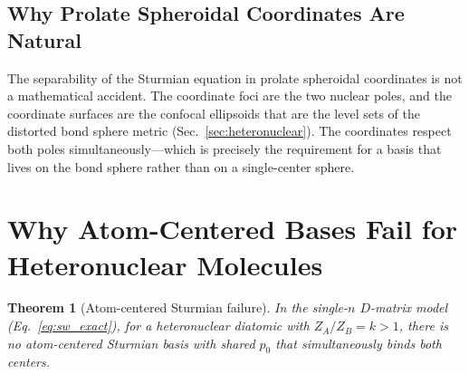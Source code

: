\documentclass[aps,pra,twocolumn,superscriptaddress,longbibliography]{revtex4-2}
\newtheorem{theorem}{Theorem}
\theoremstyle{remark}
\theoremstyle{plain}
\begin{document}
\subsection{Why Prolate Spheroidal Coordinates Are Natural}

The separability of the Sturmian equation in prolate spheroidal
coordinates is not a mathematical accident.  The coordinate foci are
the two nuclear poles, and the coordinate surfaces are the confocal
ellipsoids that are the level sets of the distorted bond sphere metric
(Sec.~\ref{sec:heteronuclear}).  The coordinates respect both poles
simultaneously---which is precisely the requirement for a basis that
lives on the bond sphere rather than on a single-center sphere.


\section{Why Atom-Centered Bases Fail for Heteronuclear Molecules}
\label{sec:failure}

\begin{theorem}[Atom-centered Sturmian failure]
\label{thm:failure}
In the single-$n$ $D$-matrix model (Eq.~\eqref{eq:sw_exact}), for a
heteronuclear diatomic with $Z_A/Z_B = k > 1$, there is no
atom-centered Sturmian basis with shared $p_0$ that simultaneously
binds both centers.
\end{theorem}
\end{document}
